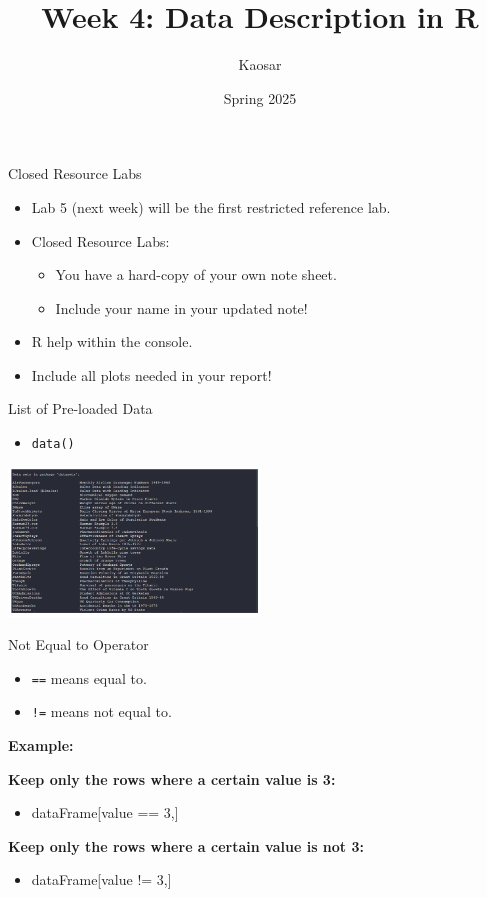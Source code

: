 \documentclass{beamer}
\title{Week 4: Data Description in R}
\author{Kaosar}
\institute{Auburn University}
\date{Spring 2025}
\begin{document}
\frame{\titlepage}

\begin{frame}{ Closed Resource Labs}
  
    \begin{itemize}
        \item Lab 5 (next week) will be the first restricted reference lab.
        \item Closed Resource Labs:
        \begin{itemize}
            \item You have a hard-copy of your own note sheet.
            \item Include your name in your updated note!
        \end{itemize}
        \item R help within the console.
        \item Include all plots needed in your report!
    \end{itemize}
\end{frame}

\begin{frame}{List of Pre-loaded Data}
    \begin{itemize}
        \item \texttt{data()}
    \end{itemize}
    \centering
    \includegraphics[width=0.5\textwidth]{3611_p7.png} %
\end{frame}  %

\begin{frame}{Not Equal to Operator}
    \begin{itemize}
        \item \texttt{==} means equal to.
        \item \texttt{!=} means not equal to.
    \end{itemize}

    \textbf{Example:}
    
    \textbf{Keep only the rows where a certain value is 3:}
    \begin{itemize}
        \item dataFrame[value == 3,]
    \end{itemize}

    \textbf{Keep only the rows where a certain value is not 3:}
    \begin{itemize}
        \item dataFrame[value != 3,]
    \end{itemize}

\end{frame}
\end{document}
